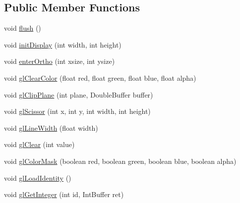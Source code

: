 \subsection*{Public Member Functions}
\begin{DoxyCompactItemize}
\item 
void \mbox{\hyperlink{interfaceorg_1_1newdawn_1_1slick_1_1opengl_1_1renderer_1_1_s_g_l_a97c40969d74b57d2df86421d53b9c55c}{flush}} ()
\item 
void \mbox{\hyperlink{interfaceorg_1_1newdawn_1_1slick_1_1opengl_1_1renderer_1_1_s_g_l_a7c5e2c0345c667230bab6bc67865fd24}{init\+Display}} (int width, int height)
\item 
void \mbox{\hyperlink{interfaceorg_1_1newdawn_1_1slick_1_1opengl_1_1renderer_1_1_s_g_l_a703b23e860de8e89ed9380d598a8a4bc}{enter\+Ortho}} (int xsize, int ysize)
\item 
void \mbox{\hyperlink{interfaceorg_1_1newdawn_1_1slick_1_1opengl_1_1renderer_1_1_s_g_l_ad629840de5bb3d1baed92ccf8085068b}{gl\+Clear\+Color}} (float red, float green, float blue, float alpha)
\item 
void \mbox{\hyperlink{interfaceorg_1_1newdawn_1_1slick_1_1opengl_1_1renderer_1_1_s_g_l_aa0ecf8896be6f072c3d38372179071f8}{gl\+Clip\+Plane}} (int plane, Double\+Buffer buffer)
\item 
void \mbox{\hyperlink{interfaceorg_1_1newdawn_1_1slick_1_1opengl_1_1renderer_1_1_s_g_l_a59255fbfa67e6f0cd325f2bbe418d358}{gl\+Scissor}} (int x, int y, int width, int height)
\item 
void \mbox{\hyperlink{interfaceorg_1_1newdawn_1_1slick_1_1opengl_1_1renderer_1_1_s_g_l_a6c064bfcda5e00a6b94f15f0c3b448f4}{gl\+Line\+Width}} (float width)
\item 
void \mbox{\hyperlink{interfaceorg_1_1newdawn_1_1slick_1_1opengl_1_1renderer_1_1_s_g_l_a254bdaa78a48f3fd3fd4ada15c910d4a}{gl\+Clear}} (int value)
\item 
void \mbox{\hyperlink{interfaceorg_1_1newdawn_1_1slick_1_1opengl_1_1renderer_1_1_s_g_l_a35f9b484d84c168623bc7236152f2d50}{gl\+Color\+Mask}} (boolean red, boolean green, boolean blue, boolean alpha)
\item 
void \mbox{\hyperlink{interfaceorg_1_1newdawn_1_1slick_1_1opengl_1_1renderer_1_1_s_g_l_a55d2290e0e4840f3aff84bf698d0ea60}{gl\+Load\+Identity}} ()
\item 
void \mbox{\hyperlink{interfaceorg_1_1newdawn_1_1slick_1_1opengl_1_1renderer_1_1_s_g_l_ab04cb68029b55582eb4b17b489cbbb2f}{gl\+Get\+Integer}} (int id, Int\+Buffer ret)
\item 

\end{DoxyCompactItemize}
